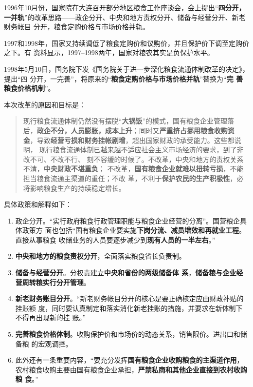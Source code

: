 1996年10月份，国家院在大连召开部分地区粮食工作座谈会，会上提出“\textbf{四分开，
  一并轨}”的改革思路——政企分开、中央和地方责权分开、储备与经营分开、新老财务帐目
分开，粮食定购价格与市场价格并轨。

1997和1998年，国家又持续调低了粮食定购价和议购价，并且保护价下调至定购价之下。有
资料显示，1997--1998两年，国家对粮农其实是负保护水平。

1998年5月10日，国务院下发《国务院关于进一步深化粮食流通体制改革的决定》，提出“四
分开，一完善”，将原来的“\textbf{粮食定购价格与市场价格并轨}”替换为“\textbf{完
  善粮食价格机制}”。

本次改革的原因和目标是：
\begin{quotation}
  现行粮食流通体制仍然没有摆脱“\textbf{大锅饭}”的模式，国有粮食企业管理落
  后，\textbf{政企不分，人员膨胀，成本上升}；同时又\textbf{严重挤占挪用粮食收购资
    金}，导致\textbf{经营亏损和财务挂帐剧增}，超出国家财政的承受能力。这些都说明，
  现行粮食流通体制已越来越不适应社会主义市场经济的要求，到了非改不可、不改不行、
  刻不容缓的时候了。不改革，中央和地方的责权关系不清，\textbf{中央财政不堪重负}；
  不改革，\textbf{国有粮食企业就难以扭转亏损}，不能担当粮食流通主渠道的重任；不改
  革，不利于\textbf{保护农民的生产积极性}，必将影响粮食生产的持续稳定增长。
\end{quotation}

具体政策和解释如下：
\begin{enumerate}
\item 政企分开。“实行政府粮食行政管理职能与粮食企业经营的分离”。国营粮企具体政策方
  面也包括“国有粮食企业要实施\textbf{下岗分流、减员增效和再就业工程}。直接从事粮食
  收储业务的人员要逐步减少到\textbf{现有人员的一半左右}。”

\item \textbf{中央和地方的粮食责权分开}，全面落实粮食省长负责制。

\item \textbf{储备与经营分开}。分权责建立\textbf{中央和省份的两级储备体
    系}，\textbf{储备粮与企业经营周转粮实行分开管理}。

\item \textbf{新老财务账目分开}。“新老财务帐目分开的核心是要正确核定应由财政补贴的挂账额
  度，同时要认真制定和落实消化新老挂账的措施，并要求在新体制下不得再出现新的挂
  账。”\cite{caobaoming01}

\item \textbf{完善粮食价格体制}。收购保护价和市场价的动态关系，销售限价。进出口和储备粮
  的宏观调控。

\item 此外还有一条重要内容，“要充分发挥\textbf{国有粮食企业收购粮食的主渠道作用}，
  农村粮食收购主要由国有粮食企业承担，\textbf{严禁私商和其他企业直接到农村收购粮
    食}。”
\end{enumerate}

